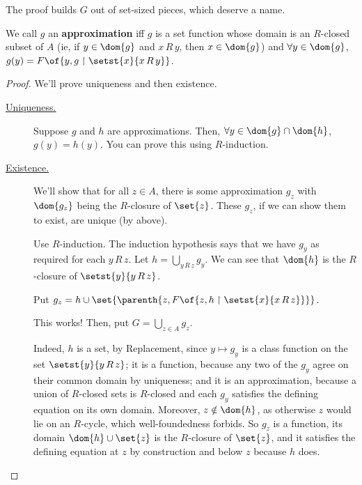 The proof builds $G$ out of set-sized pieces, which deserve a name.

\begin{boxdefinition}[Approximation]
    We call $g$ an \textbf{approximation} iff $g$ is a set function whose domain is an $R$-closed subset of $A$ (ie, if $y \in \dom{g}$ and $x \, R \, y$, then $x \in \dom{g}$) and $\forall y \in \dom{g}$, $g(y) = F\of{y, g \restriction \setst{x}{x \, R \, y}}$.
\end{boxdefinition}

\begin{proof}
    We'll prove uniqueness and then existence.

    \begin{description}
        \item[\underline{Uniqueness.}]
            Suppose $g$ and $h$ are approximations. Then, $\forall y \in \dom{g} \cap \dom{h}$, $g(y) = h(y)$. You can prove this using $R$-induction.

        \item[\underline{Existence.}]
            We'll show that for all $z \in A$, there is some approximation $g_z$ with $\dom{g_z}$ being the $R$-closure of $\set{z}$. These $g_z$, if we can show them to exist, are unique (by above).

            Use $R$-induction. The induction hypothesis says that we have $g_y$ as required for each $y \, R \, z$. Let $h = \bigcup_{y \, R \, z} g_y$. We can see that $\dom{h}$ is the $R$-closure of $\setst{y}{y \, R \, z}$.

            Put $g_z = h \cup \set{\parenth{z, F\of{z, h \restriction \setst{x}{x \, R \, z}}}}$.

            This works! Then, put $G = \bigcup_{z \in A} g_z$.

            Indeed, $h$ is a set, by Replacement, since $y \mapsto g_y$ is a class function on the set $\setst{y}{y \, R \, z}$; it is a function, because any two of the $g_y$ agree on their common domain by uniqueness; and it is an approximation, because a union of $R$-closed sets is $R$-closed and each $g_y$ satisfies the defining equation on its own domain. Moreover, $z \notin \dom{h}$, as otherwise $z$ would lie on an $R$-cycle, which well-foundedness forbids. So $g_z$ is a function, its domain $\dom{h} \cup \set{z}$ is the $R$-closure of $\set{z}$, and it satisfies the defining equation at $z$ by construction and below $z$ because $h$ does.


\end{description}
\end{proof}
